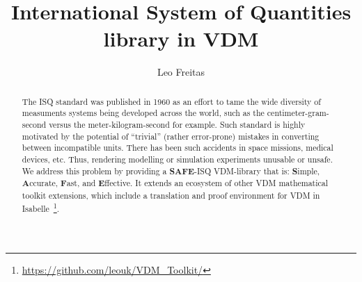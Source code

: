 \documentclass[runningheads,a4paper]{llncs}
\begin{document}
%



\title{International System of Quantities library in VDM}

\author{Leo Freitas
}
\authorrunning{ }

			
\maketitle
\setcounter{footnote}{0} 
\begin{abstract}
    The \gls{ISQ} standard was published in 1960 as an effort to tame the wide diversity of measuments systems being developed across the world, such as the centimeter-gram-second versus the meter-kilogram-second for example. Such standard is highly motivated by the potential of ``trivial'' (rather error-prone) mistakes in converting between incompatible units. There has been such accidents in space missions, medical devices, etc. Thus, rendering modelling or simulation experiments unusable or unsafe. We address this problem by providing a \textbf{SAFE}-ISQ VDM-library that is: \textbf{S}imple, \textbf{A}ccurate, \textbf{F}ast, and \textbf{E}ffective. It extends an ecosystem of other VDM mathematical toolkit extensions, which include a translation and proof environment for VDM in Isabelle~\footnote{\url{https://github.com/leouk/VDM_Toolkit/}}.
\end{abstract}

\end{document}
